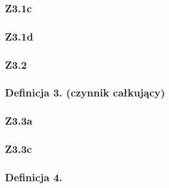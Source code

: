 \documentclass[10pt,a4paper]{article}
\begin{document}
{    \subsubsection*{Z3.1c}
    \begin{quote}
    \end{quote}

    \subsubsection*{Z3.1d}
    \begin{quote}
    \end{quote}

    \subsubsection*{Z3.2}
    \begin{quote}
    \end{quote}

    \begin{tcolorbox}[mybox]
    \subsubsection*{Definicja 3. (czynnik całkujący)}
    \begin{quote}
    \end{quote}
    \end{tcolorbox}

    \subsubsection*{Z3.3a}
    \begin{quote}
    \end{quote}

    \subsubsection*{Z3.3c}
    \begin{quote}
    \end{quote}

    \begin{tcolorbox}[mybox]
    \subsubsection*{Definicja 4.}
    \begin{quote}
    \end{quote}
    \end{tcolorbox}
}
\end{document}
